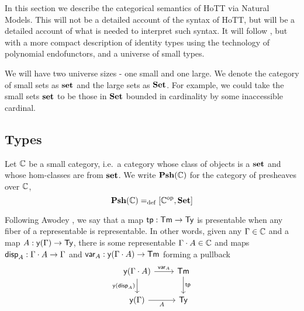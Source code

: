 In this section we describe the categorical semantics of
HoTT via Natural Models.
This will not be a detailed account of the syntax of HoTT,
but will be a detailed account of what is needed to interpret such syntax.
It will follow \cite{awodey2017naturalmodelshomotopytype},
but with a more compact description of identity types
using the technology of polynomial endofunctors,
and a universe of small types.

\medskip

\begin{notation*}
  We will have two universe sizes - one small and one large.
  We denote the category of small sets as $\mathbf{set}$ and the large sets as $\mathbf{Set}$.
  For example, we could take the small sets $\mathbf{set}$ to be those in $\mathbf{Set}$ bounded in cardinality
  by some inaccessible cardinal.
\end{notation*}

\subsection{Types}


Let $\mathbb{C}$ be a small category, i.e.~a category whose class of objects is a $\mathbf{set}$ and
whose hom-classes are from $\mathbf{set}$.
We write $\mathbf{Psh}(\mathbb{C})$ for the category of presheaves over $\mathbb{C}$,
\[
\mathbf{Psh}(\mathbb{C}) =_{\mathrm{def}} [\mathbb{C}^{\mathrm{op}}, \mathbf{Set}]
\]

\medskip


\begin{defn}
  Following Awodey \cite{awodey2017naturalmodelshomotopytype},
  we say that a map $\mathsf{tp} : \mathsf{Tm} \to \mathsf{Ty}$ is presentable when
  any fiber of a representable is representable.
  In other words, given any $\Gamma \in \mathbb{C}$ and a map $A : \mathsf{y} (\Gamma) \to \mathsf{Ty}$,
  there is some representable $\Gamma \cdot A \in \mathbb{C}$ and maps $\mathsf{disp}_{A} : \Gamma \cdot A \to \Gamma$
  and $\mathsf{var}_{A} : \mathsf{y} (\Gamma \cdot A) \to \mathsf{Tm}$ forming a pullback
\[\begin{tikzcd}
	{\yo (\Ga \cdot A)} & \Term \\
	{\yo (\Ga)} & \Type
	\arrow["{\var_A}", from=1-1, to=1-2]
	\arrow["{\yo (\disp{A})}"', from=1-1, to=2-1]
	\arrow["\tp", from=1-2, to=2-2]
	\arrow["A"', from=2-1, to=2-2]
\end{tikzcd}\]
\end{defn}

